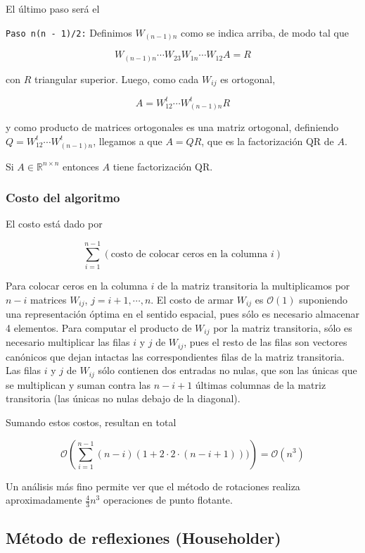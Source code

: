 El último paso será el

\texttt{Paso n(n - 1)/2:} Definimos $W_{(n - 1)n}$ como se indica arriba, de modo tal que

\[W_{(n-1)n} \cdots W_{23}W_{1n} \cdots W_{12} A = R\]

con $R$ triangular superior. Luego, como cada $W_{ij}$ es ortogonal,

\[A = W_{12}^t \cdots W_{(n-1)n}^tR\]

y como producto de matrices ortogonales es una matriz ortogonal, definiendo $Q = W_{12}^t \cdots W_{(n-1)n}^t$, llegamos a que $A = QR$, que es la factorización QR de $A$.

\begin{propo}
Si $A \in \mathbb{R}^{n \times n}$ entonces $A$ tiene factorización QR.
\end{propo}

\subsubsection{Costo del algoritmo}

El costo está dado por

\[\sum_{i = 1}^{n - 1}(\text{costo de colocar ceros en la columna }i)\]

Para colocar ceros en la columna $i$ de la matriz transitoria la multiplicamos por $n - i$ matrices $W_{ij}$, $j = i + 1, \cdots, n$. El costo de armar $W_{ij}$ es $\mathcal{O}(1)$ suponiendo una representación óptima en el sentido espacial, pues sólo es necesario almacenar 4 elementos. Para computar el producto de $W_{ij}$ por la matriz transitoria, sólo es necesario multiplicar las filas $i$ y $j$ de $W_{ij}$, pues el resto de las filas son vectores canónicos que dejan intactas las correspondientes filas de la matriz transitoria. Las filas $i$ y $j$ de $W_{ij}$ sólo contienen dos entradas no nulas, que son las únicas que se multiplican y suman contra las $n - i + 1$ últimas columnas de la matriz transitoria (las únicas no nulas debajo de la diagonal).

Sumando estos costos, resultan en total

\[\mathcal{O}\left(\sum_{i = 1}^{n - 1}(n - i)(1 + 2\cdot 2 \cdot (n - i + 1)))\right) = \mathcal{O}(n^3)\]

Un análisis más fino permite ver que el método de rotaciones realiza aproximadamente $\frac{4}{3}n^3$ operaciones de punto flotante.

\subsection{Método de reflexiones (Householder)}

